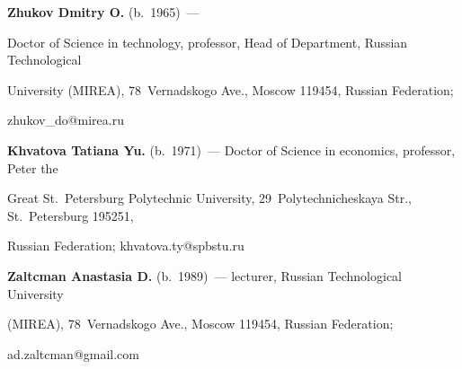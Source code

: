 \noindent


\textbf{Zhukov Dmitry O.} (b.\ 1965)~--- 


Doctor of Science in technology, professor, Head of Department, Russian Technological 


University (MIREA), 78~Vernadskogo Ave., Moscow 119454, Russian Federation; 


\mbox{zhukov\_do@mirea.ru}





\vspace*{6pt}





\noindent


\textbf{Khvatova Tatiana Yu.} (b.\ 1971)~--- Doctor of Science in economics, professor, Peter the 


Great St.\ Petersburg Polytechnic University, 29~Polytechnicheskaya Str., St.\ Petersburg 195251, 


Russian Federation; \mbox{khvatova.ty@spbstu.ru}





\vspace*{6pt}





\noindent


\textbf{Zaltcman Anastasia D.} (b.\ 1989)~--- lecturer, Russian Technological University 


(MIREA), 78~Vernadskogo Ave., Moscow 119454, Russian Federation; 


\mbox{ad.zaltcman@gmail.com}





\label{end\stat}





\renewcommand{\bibname}{\protect\rm Литература} 


